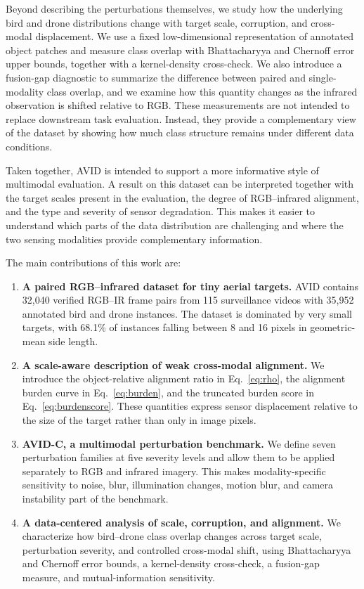 \documentclass[10pt]{article}
\newcommand{\dataset}{\textsc{AVID}}
\newcommand{\corrupt}{\textsc{AVID-C}}
\begin{document}
Beyond describing the perturbations themselves, we study how the underlying bird and drone distributions change with target scale, corruption, and cross-modal displacement. We use a fixed low-dimensional representation of annotated object patches and measure class overlap with Bhattacharyya and Chernoff error upper bounds, together with a kernel-density cross-check. We also introduce a fusion-gap diagnostic to summarize the difference between paired and single-modality class overlap, and we examine how this quantity changes as the infrared observation is shifted relative to RGB. These measurements are not intended to replace downstream task evaluation. Instead, they provide a complementary view of the dataset by showing how much class structure remains under different data conditions.

Taken together, \dataset{} is intended to support a more informative style of multimodal evaluation. A result on this dataset can be interpreted together with the target scales present in the evaluation, the degree of RGB--infrared alignment, and the type and severity of sensor degradation. This makes it easier to understand which parts of the data distribution are challenging and where the two sensing modalities provide complementary information.

The main contributions of this work are:

\begin{enumerate}
    \item \textbf{A paired RGB--infrared dataset for tiny aerial targets.}
    \dataset{} contains 32,040 verified RGB--IR frame pairs from 115 surveillance videos with 35,952 annotated bird and drone instances. The dataset is dominated by very small targets, with 68.1\% of instances falling between 8 and 16 pixels in geometric-mean side length.

    \item \textbf{A scale-aware description of weak cross-modal alignment.}
    We introduce the object-relative alignment ratio in Eq.~\ref{eq:rho}, the alignment burden curve in Eq.~\ref{eq:burden}, and the truncated burden score in Eq.~\ref{eq:burdenscore}. These quantities express sensor displacement relative to the size of the target rather than only in image pixels.

    \item \textbf{\corrupt{}, a multimodal perturbation benchmark.}
    We define seven perturbation families at five severity levels and allow them to be applied separately to RGB and infrared imagery. This makes modality-specific sensitivity to noise, blur, illumination changes, motion blur, and camera instability part of the benchmark.

    \item \textbf{A data-centered analysis of scale, corruption, and alignment.}
    We characterize how bird--drone class overlap changes across target scale, perturbation severity, and controlled cross-modal shift, using Bhattacharyya and Chernoff error bounds, a kernel-density cross-check, a fusion-gap measure, and mutual-information sensitivity.
\end{enumerate}
\end{document}
